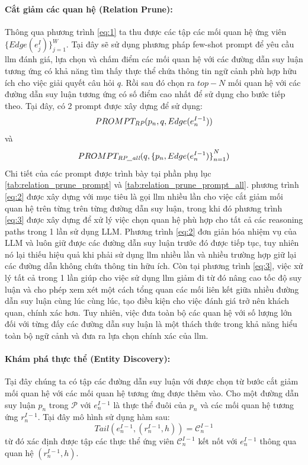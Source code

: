 \paragraph{Cắt giảm các quan hệ (Relation Prune):}
Thông qua phương trình \ref{eq:1} ta thu được các tập các mối quan hệ ứng viên
$\{{Edge(e^I_j )}\}^W_{j=1}$. Tại đây sẽ sử dụng phương pháp few-shot prompt để yêu cầu \gls{llm} đánh giá, lựa chọn và chấm điểm các mối quan hệ với các đường dẫn suy luận tương ứng có khả năng tìm thấy thực thể chứa thông tin ngữ cảnh phù hợp hữu ích cho việc giải quyết câu hỏi $q$. Rồi sau đó chọn ra $top-N$ mối quan hệ với các đường dẫn suy luận tương ứng có số điểm cao nhất để sử dụng cho bước tiếp theo. Tại đây, có 2 prompt được xây dựng để sử dụng:
\begin{equation}
    PROMPT_\emph{RP}(p_n , q, Edge(e^{I - 1}_n))
    \label{eq:2}
\end{equation}
và
\begin{equation}
    PROMPT_\emph{RP\_all} (q, {\{p_n, Edge(e^{I-1}_n)\}}^N_{n=1})
    \label{eq:3}
\end{equation}
Chi tiết của các prompt được trình bày tại phần phụ lục \ref{tab:relation_prune_prompt} và \ref{tab:relation_prune_prompt_all}. phương trình \ref{eq:2} được xây dựng với mục tiêu là gọi \gls{llm} nhiều lần cho việc cắt giảm mối quan hệ trên từng trên từng đường dẫn suy luận, trong khi đó phương trình \ref{eq:3} được xây dựng để xử lý việc chọn quan hệ phù hợp cho tất cả các reasoning paths trong 1 lần sử dụng LLM. Phương trình \ref{eq:2} đơn giản hóa nhiệm vụ của LLM và luôn giữ được các đường dẫn suy luận trước đó được tiếp tục, tuy nhiên nó lại thiếu hiệu quả khi phải sử dụng \gls{llm} nhiều lần và nhiều trường hợp giữ lại các đường dẫn không chứa thông tin hữu ích. Còn tại phương trình \ref{eq:3}, việc xử lý tất cả trong 1 lần giúp cho việc sử dụng \gls{llm} giảm đi từ đó nâng cao tốc độ suy luận và cho phép xem xét một cách tổng quan các mối liên kết giữa nhiều đường dẫn suy luận cùng lúc cùng lúc, tạo điều kiện cho việc đánh giá trở nên khách quan, chính xác hơn. Tuy nhiên, việc đưa toàn bộ các quan hệ với số lượng lớn đối với từng đấy các đường dẫn suy luận là một thách thức trong khả năng hiểu toàn bộ ngữ cảnh và đưa ra lựa chọn chính xác của \gls{llm}.


\paragraph{Khám phá thực thể (Entity Discovery):} Tại đây chúng ta có tập các đường dẫn suy luận với được chọn từ bước cắt giảm mối quan hệ với các mối quan hệ tương ứng được thêm vào. Cho một đường dẫn suy luận $p_n$ trong $\mathcal{P}$ với $e^{I - 1}_n$ là thực thể đuôi của $p_n$ và các mối quan hệ tương ứng $r^{I - 1}_n$. Tại đây mô hình sử dụng hàm sau:
\begin{equation}
    Tail(e^{I - 1}_n, (r^{I - 1}_n, h)) = \mathcal{C}^{I - 1}_n
    \label{eq:4}
\end{equation}
từ đó xác định được tập các thực thể ứng viên $\mathcal{C}^{I - 1}_n$ kết nốt với $e^{I - 1}_n$ thông qua quan hệ $(r^{I - 1}_n, h)$.




